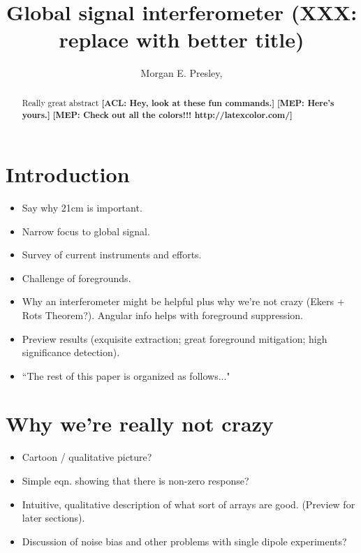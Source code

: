 \documentclass[twolcolumn,apj]{emulateapj}
\newcommand{\acl}[1]{{\color{red} \textbf{[ACL:  #1]}}}
\newcommand{\mep}[1]{{\color{applegreen} \textbf{[MEP:  #1]}}}
\begin{document}
\title{Global signal interferometer (XXX: replace with better title)}

\author{Morgan E. Presley,
}

\begin{abstract}
Really great abstract
\acl{Hey, look at these fun commands.}
\mep{Here's yours.}
\mep {Check out all the colors!!! http://latexcolor.com/}
\end{abstract}



\section{Introduction}
\begin{itemize}
\item Say why 21cm is important.
\item Narrow focus to global signal.
\item Survey of current instruments and efforts.
\item Challenge of foregrounds.
\item Why an interferometer might be helpful plus why we're not crazy (Ekers + Rots Theorem?).  Angular info helps with foreground suppression.
\item Preview results (exquisite extraction; great foreground mitigation; high significance detection).
\item ``The rest of this paper is organized as follows..."
\end{itemize}

\section{Why we're really not crazy}
\begin{itemize}
\item Cartoon / qualitative picture?
\item Simple eqn. showing that there is non-zero response?
\item Intuitive, qualitative description of what sort of arrays are good.  (Preview for later sections).
\item Discussion of noise bias and other problems with single dipole experiments?
\end{itemize}
\end{document}
